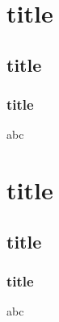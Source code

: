 \documentclass{beamer}
\begin{document}
\section{title}
\subsection{title}
\subsubsection{title}   
\begin{frame}
    abc
\end{frame} 

\section{title}
\subsection{title}
\subsubsection{title}   
\begin{frame}
    abc
\end{frame} 
\end{document}
